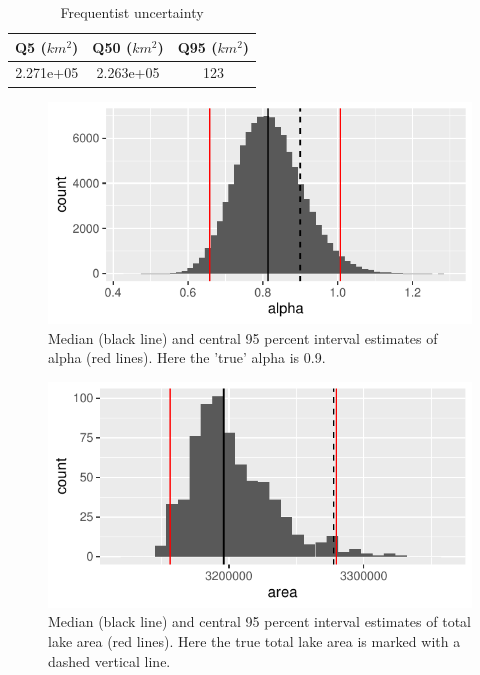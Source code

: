 \documentclass{article}
\begin{document}
\begin{table}
	\caption{Frequentist uncertainty}
	\centering
	\begin{tabular}{ccc}
		\toprule
		Q5 ($km^2$) & Q50 ($km^2$) & Q95 ($km^2$) \\
		\midrule
		2.271e+05          & 2.263e+05   & 123     \\
		\bottomrule
	\end{tabular}
	\label{tab:frequentist_uncertainty}
\end{table}

\begin{figure}
	\centering
	\includegraphics{figures/bayesian_model-1}
	\caption{Median (black line) and central 95 percent interval estimates of alpha (red lines). Here the 'true' alpha is 0.9.}
	\label{fig:bayesian_model}
\end{figure}

\begin{figure}
	\centering
	\includegraphics{figures/bayesian_area-1}
	\caption{Median (black line) and central 95 percent interval estimates of total lake area (red lines). Here the true total lake area is marked with a dashed vertical line.}
	\label{fig:bayesian_area}
\end{figure}
\end{document}
